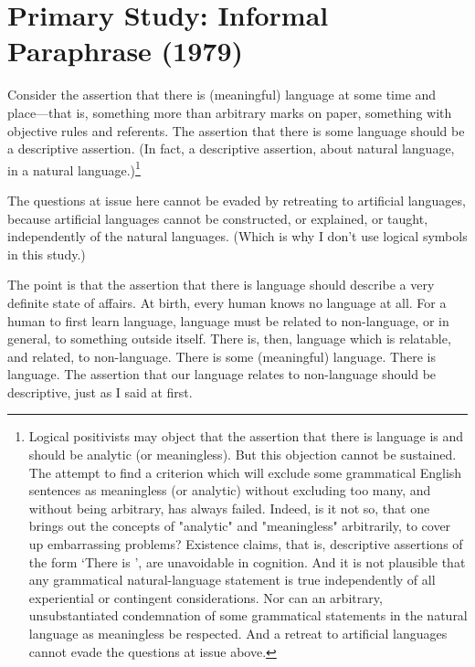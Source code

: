 









\chapter{Primary Study: Informal Paraphrase (1979)}

Consider the assertion that there is (meaningful) language at some time and place---that is, something more than arbitrary marks on paper, something with objective rules and referents. The assertion that there is some language should be a descriptive assertion. (In fact, a descriptive assertion, about natural language, in a natural language.)\footnote{Logical positivists may object that the assertion that there is language is and should be analytic (or meaningless). But this objection cannot be sustained. The attempt to find a criterion which will exclude some grammatical English sentences as meaningless (or analytic) without excluding too many, and without being arbitrary, has always failed. Indeed, is it not so, that one brings out the concepts of "analytic" and "meaningless" arbitrarily, to cover up embarrassing problems? Existence claims, that is, descriptive assertions of the form `There is \uline{\qquad}', are unavoidable in cognition. And it is not plausible that any grammatical natural-language statement is true independently of all experiential or contingent considerations. Nor can an arbitrary, unsubstantiated condemnation of some grammatical statements in the natural language as meaningless be respected. And a retreat to artificial languages cannot evade the questions at issue above.}

The questions at issue here cannot be evaded by retreating to artificial languages, because artificial languages cannot be constructed, or explained, or taught, independently of the natural languages. (Which is why I don't use logical symbols in this study.)

The point is that the assertion that there is language should describe a very definite state of affairs. At birth, every human knows no language at all. For a human to first learn language, language must be related to non-language, or in general, to something outside itself. There is, then, language which is relatable, and related, to non-language. There is some (meaningful) language. There is language. The assertion that our language relates to non-language should be descriptive, just as I said at first.

